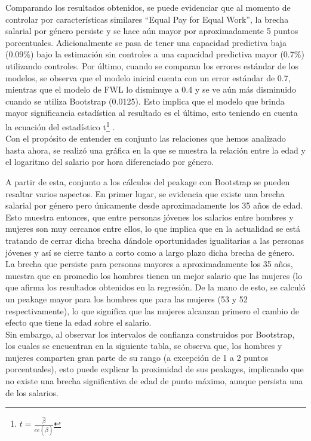 \documentclass[12pt]{article}
\begin{document}
Comparando los resultados obtenidos, se puede evidenciar que al momento de controlar por características similares “Equal Pay for Equal Work”, la brecha salarial por género persiste y se hace aún mayor por aproximadamente 5 puntos porcentuales. Adicionalmente se pasa de tener una capacidad predictiva baja (0.09\%) bajo la estimación sin controles a una capacidad predictiva mayor (0.7\%) utilizando controles. Por último, cuando se comparan los errores estándar de los modelos, se observa que el modelo inicial cuenta con un error estándar de 0.7, mientras que el modelo de FWL lo disminuye a 0.4 y se ve aún más disminuido cuando se utiliza Bootstrap (0.0125). Esto implica que el modelo que brinda mayor significancia estadística al resultado es el último, esto teniendo en cuenta la ecuación del estadístico t\footnote{$t=\frac{\hat{\beta}}{ee(\hat{\beta})}$} . \\

Con el propósito de entender en conjunto las relaciones que hemos analizado hasta ahora, se realizó una gráfica en la que se muestra la relación entre la edad y el logaritmo del salario por hora diferenciado por género. 



A partir de esta, conjunto a los cálculos del peakage con Bootstrap se pueden resaltar varios aspectos. En primer lugar, se evidencia que existe una brecha salarial por género pero únicamente desde aproximadamente los 35 años de edad. Esto muestra entonces, que entre personas jóvenes los salarios entre hombres y mujeres son muy cercanos entre ellos, lo que implica que en la actualidad se está tratando de cerrar dicha brecha dándole oportunidades igualitarias a las personas jóvenes y así se cierre tanto a corto como a largo plazo dicha brecha de género. La brecha que persiste para personas mayores a aproximadamente los 35 años, muestra que en promedio los hombres tienen un mejor salario que las mujeres (lo que afirma los resultados obtenidos en la regresión. De la mano de esto, se calculó un peakage mayor para los hombres que para las mujeres (53 y 52 respectivamente), lo que significa que las mujeres alcanzan primero el cambio de efecto que tiene la edad sobre el salario. \\





 Sin embargo, al observar los intervalos de confianza construidos por Bootstrap, los cuales se encuentran en la siguiente tabla, se observa que, los hombres y mujeres comparten gran parte de su rango (a excepción de 1 a 2 puntos porcentuales), esto puede explicar la proximidad de sus peakages, implicando que no existe una brecha significativa de edad de punto máximo, aunque persista una de los salarios.
\end{document}
